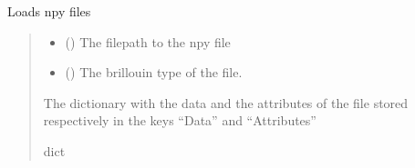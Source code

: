 \documentclass[letterpaper,10pt,english]{sphinxmanual}
\begin{document}

\begin{fulllineitems}
\label{\detokenize{source/_autosummary/HDF5_BLS.load_data:HDF5_BLS.load_data.load_npy_file}}
\pysigstartsignatures
\pysiglinewithargsret
{}
{\sphinxparamcomma {}}
{}
\pysigstopsignatures
\sphinxAtStartPar
Loads npy files
\begin{quote}\begin{description}
\begin{itemize}
\item {} 
\sphinxAtStartPar
{} () \textendash{} The filepath to the npy file

\item {} 
\sphinxAtStartPar
{} (\sphinxstyleliteralemphasis{\sphinxupquote{, }}) \textendash{} The brillouin type of the file.

\end{itemize}

\sphinxAtStartPar
The dictionary with the data and the attributes of the file stored respectively in the keys “Data” and “Attributes”

\sphinxAtStartPar
dict

\end{description}\end{quote}

\end{fulllineitems}

\end{document}
